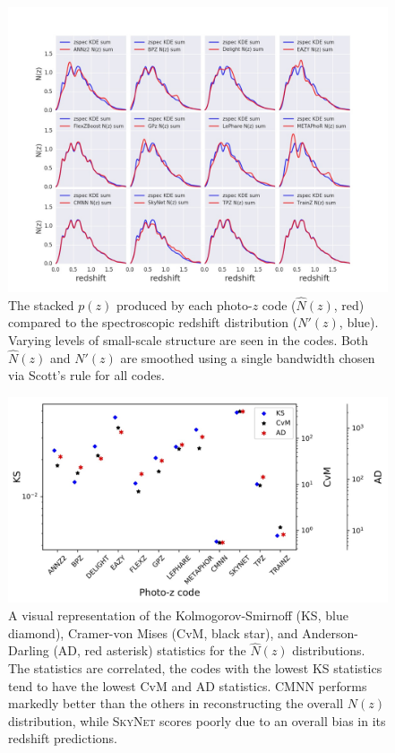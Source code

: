\begin{figure}
\centering
\includegraphics[width=\textwidth]{fig/NZsumplot_12codes_scottsrule.jpg}
\caption{The stacked $p(z)$ produced by each photo-$z$ code ($\hat{N}(z)$, red) compared to the spectroscopic redshift distribution ($N'(z)$, blue).  Varying levels of small-scale structure are seen in the codes.  Both $\hat{N}(z)$ and $N'(z)$ are smoothed using a single bandwidth chosen via Scott's rule for all codes.} \label{fig:nz}
\end{figure}

\begin{figure}
\centering
\includegraphics[width=\textwidth]{fig/KSvsCvMvsAD_NZ_withnull_jpg.jpg}
\caption{A visual representation of the Kolmogorov-Smirnoff (KS, blue diamond), Cramer-von Mises (CvM, black star), and Anderson-Darling (AD, red asterisk) statistics for the $\hat{N}(z)$ distributions. The statistics are correlated, the codes with the lowest KS statistics tend to have the lowest CvM and AD statistics.  \textsc{CMNN} performs markedly better than the others in reconstructing the overall $N(z)$ distribution, while \textsc{SkyNet} scores poorly due to an overall bias in its redshift predictions.} \label{fig:nz_stats}
\end{figure}


